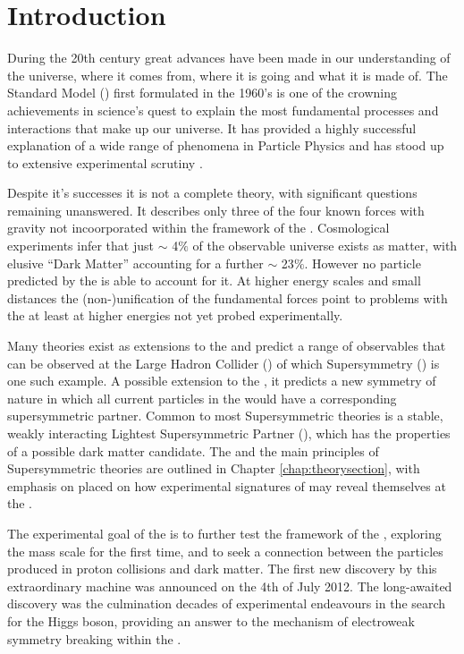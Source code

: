 \chapter{Introduction}
\label{chap:introduction}

During the 20th century great advances have been made in our understanding of the universe, where it comes from, where it is going and what it is made of. The Standard Model (\SM) first formulated in the 1960's is one of the crowning achievements in science's quest to explain the most fundamental processes and interactions that make up our universe. It has provided a highly successful explanation of a wide range of phenomena in Particle Physics and has stood up to extensive experimental scrutiny \cite{pdg2012}.

Despite it's successes it is not  a complete theory, with significant questions remaining unanswered. It describes only three of the four known forces with gravity not incoorporated within the framework of the \SM. Cosmological experiments infer that just $\sim$ 4$\%$ of the observable universe exists as matter, with elusive ``Dark Matter'' accounting for a further $\sim$ 23$\%$. However no particle predicted by the \SM is able to account for it.  At higher energy scales and small distances the (non-)unification of the fundamental forces point to problems with the \SM at least at higher energies not yet probed experimentally. 

Many theories exist as extensions to the \SM and predict a range of observables that can be observed at the Large Hadron Collider (\LHC) of which Supersymmetry (\SUSY) is one such example. A possible extension to the \SM, it predicts a new symmetry of nature in which all current particles in the \SM would have a corresponding supersymmetric partner. Common to most Supersymmetric theories is a stable, weakly interacting Lightest Supersymmetric Partner (\LSP), which has the properties of a possible dark matter candidate. The \SM and the main principles of Supersymmetric theories are outlined in Chapter \ref{chap:theorysection}, with emphasis on placed on how experimental signatures of \SUSY may reveal themselves at the \LHC.

The experimental goal of the \LHC is to further test the framework of the \SM, exploring the \TeV mass scale for the first time, and to seek a connection between the particles produced in proton collisions and dark matter. The first new discovery by this extraordinary machine was announced on the 4th of July 2012. The long-awaited discovery was the culmination decades of experimental endeavours in the search for the Higgs boson, providing an answer to the mechanism of electroweak symmetry breaking within the \SM. 


